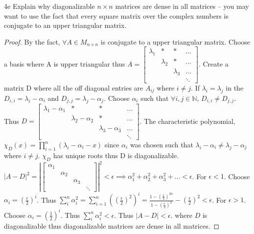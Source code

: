 \documentclass{article}
\newcommand{\N}{\mathbb{N}}
\newcommand{\abs}[1]{\lvert #1\rvert}
\begin{document}
\begin{claim}{4e}\label{Claim 4e.}
    Explain why diagonalizable $n \times n$ matrices are dense in all matrices -- you may want to use the fact that every square matrix over the complex numbers is conjugate to an upper triangular matrix.
\end{claim}
\begin{proof}
    By the fact, $\forall A \in M_{n \times n}$ is conjugate to a upper triangular matrix. Choose a basis where A is upper triangular thus $A = \begin{bmatrix}
        \lambda_1 & * & * & \hdots \\
        & \lambda_2 & * & \hdots \\
        & & \lambda_3 & \hdots \\
        & & & \ddots
    \end{bmatrix}$. Create a matrix D where all the off diagonal entries are $A_{ij}$ where $i \neq j$. If $\lambda_i = \lambda_j$ in the $D_{i,i} = \lambda_i - \alpha_i$ and $D_{j, j} = \lambda_j - \alpha_j$. Choose $\alpha_i$ such that $\forall i, j \in \N$, $D_{i, i} \neq D_{j, j}.$ Thus $D = \begin{bmatrix}
        \lambda_1 -\alpha_1 & * & * & \hdots \\
        & \lambda_2 - \alpha_2 & * & \hdots \\
        & & \lambda_3 - \alpha_3 & \hdots \\
        & & & \ddots
    \end{bmatrix}$. The characteristic polynomial, $\chi_{D}(x) = \prod_{i = 1}^{n}(\lambda_i - \alpha_i - x)$ since $\alpha_i$ was chosen such that $\lambda_i - \alpha_i \neq \lambda_j - \alpha_j$ where $i \neq j$. $\chi_D$ has unique roots thus D is diagonalizable. $\abs{A - D}^2 = \left|\begin{bmatrix}
        \alpha_1 \\
        & \alpha_2 \\
        & & \alpha_3 \\
        & & & \ddots
    \end{bmatrix}\right|^2 < \epsilon \implies \alpha_1^2 + \alpha_2^2 + \alpha_3^2 + \dots < \epsilon $. For $\epsilon < 1$. Choose $\alpha_i = \left(\frac{\epsilon}{2}\right)^i$. Thus $\sum_{i}^{n} \alpha_i^2 = \sum_{i = 1}^{n} ((\frac{\epsilon}{2})^2)^i = \frac{1 - (\frac{\epsilon}{2})^{2n}}{1 - (\frac{\epsilon}{2})^2} - (\frac{\epsilon}{2})^2 < \epsilon$. For $\epsilon > 1$. Choose $\alpha_i = \left(\frac{1}{2}\right)^i$. Thus $\sum_{i}^{n} \alpha_i^2 < \epsilon$. Thus $\abs{A - D} <\epsilon$. where $D$ is diagonalizable thus diagonalizable matrices are dense in all matrices.                  
\end{proof}
\end{document}
